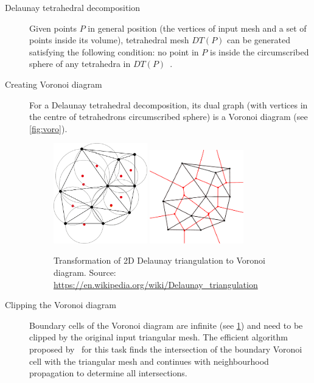 \begin{description}
    \item[Delaunay tetrahedral decomposition] Given points $P$ in general position (the vertices of input mesh and a set of points inside its volume), tetrahedral mesh $DT(P)$ can be generated satisfying the following condition: no point in $P$ is inside the circumscribed sphere of any tetrahedra in $DT(P)$~\cite{cignoni1993parallel}.
    \item[Creating Voronoi diagram] For a Delaunay tetrahedral decomposition, its dual graph (with vertices in the centre of tetrahedrons circumscribed sphere) is a Voronoi diagram (see \cref{fig:voro}).
    
 \begin{figure}
    \centering
    \includegraphics[width=0.4\textwidth]{img/delaunay}
    \includegraphics[width=0.4\textwidth]{img/voronoi}
    \caption{Transformation of 2D Delaunay triangulation to Voronoi diagram. Source: \url{https://en.wikipedia.org/wiki/Delaunay\_triangulation}}
    \label{fig:DT}
\end{figure}

    \item[Clipping the Voronoi diagram] Boundary cells of the Voronoi diagram are infinite (see \cref{fig:DT}) and need to be clipped by the original input triangular mesh. The efficient algorithm proposed by~\citet{yan2010efficient} for this task finds the intersection of the boundary Voronoi cell with the triangular mesh and continues with neighbourhood propagation to determine all intersections. 
\end{description}

